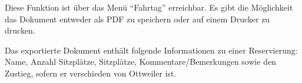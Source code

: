 Diese Funktion ist über das Menü ``Fahrtag'' erreichbar.
Es gibt die Möglichkeit das Dokument entweder als PDF zu speichern oder auf einem Drucker zu drucken.

Das exportierte Dokument enthält folgende Informationen zu einer Reservierung: Name, Anzahl Sitzplätze, Sitzplätze, Kommentare/Bemerkungen sowie den Zustieg, sofern er verschieden von Ottweiler ist.
